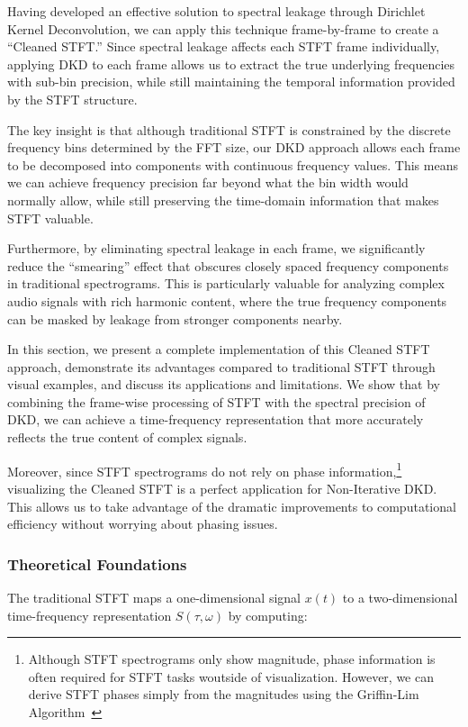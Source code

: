 \documentclass[11pt,twoside]{report}
\numberwithin{thm}{section}
\numberwithin{equation}{section}
\begin{document}
Having developed an effective solution to spectral leakage through Dirichlet Kernel Deconvolution, we can apply this technique frame-by-frame to create a ``Cleaned STFT.'' Since spectral leakage affects each STFT frame individually, applying DKD to each frame allows us to extract the true underlying frequencies with sub-bin precision, while still maintaining the temporal information provided by the STFT structure.

The key insight is that although traditional STFT is constrained by the discrete frequency bins determined by the FFT size, our DKD approach allows each frame to be decomposed into components with continuous frequency values. This means we can achieve frequency precision far beyond what the bin width would normally allow, while still preserving the time-domain information that makes STFT valuable.

Furthermore, by eliminating spectral leakage in each frame, we significantly reduce the ``smearing'' effect that obscures closely spaced frequency components in traditional spectrograms. This is particularly valuable for analyzing complex audio signals with rich harmonic content, where the true frequency components can be masked by leakage from stronger components nearby.

In this section, we present a complete implementation of this Cleaned STFT approach, demonstrate its advantages compared to traditional STFT through visual examples, and discuss its applications and limitations. We show that by combining the frame-wise processing of STFT with the spectral precision of DKD, we can achieve a time-frequency representation that more accurately reflects the true content of complex signals.

Moreover, since STFT spectrograms do not rely on phase information,\footnote{Although STFT spectrograms only show magnitude, phase information is often required for STFT tasks woutside of visualization. However, we can derive STFT phases simply from the magnitudes using the Griffin-Lim Algorithm~\cite{Hasegawa_2023}} visualizing the Cleaned STFT is a perfect application for Non-Iterative DKD. This allows us to take advantage of the dramatic improvements to computational efficiency without worrying about phasing issues.
\subsubsection{Theoretical Foundations}
The traditional STFT maps a one-dimensional signal $x(t)$ to a two-dimensional time-frequency representation $S(\tau, \omega)$ by computing:
\end{document}
